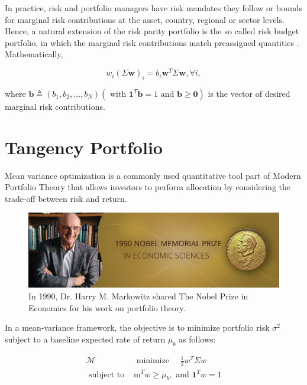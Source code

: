 \documentclass[]{book}
\theoremstyle{definition}
\theoremstyle{definition}
\theoremstyle{definition}
\theoremstyle{remark}
\begin{document}
In practice, risk and portfolio managers have risk mandates they follow
or bounds for marginal risk contributions at the asset, country,
regional or sector levels. Hence, a natural extension of the risk parity
portfolio is the so called risk budget portfolio, in which the marginal
risk contributions match preassigned quantities
\citep{R-riskParityPortfolio}. Mathematically,

\begin{equation}
w_{i}(\Sigma \mathbf{w})_{i}=b_{i} \mathbf{w}^{T} \Sigma \mathbf{w}, \forall i,
\end{equation}

where
\(\mathbf{b} \triangleq\left(b_{1}, b_{2}, \ldots, b_{N}\right)\left(\text { with } \mathbf{1}^{T} \mathbf{b}=1 \text { and } \mathbf{b} \geq \mathbf{0}\right)\)
is the vector of desired marginal risk contributions.

\section{Tangency Portfolio}\label{tangency-portfolio}

Mean variance optimization is a commonly used quantitative tool part of
Modern Portfolio Theory that allows investors to perform allocation by
considering the trade-off between risk and return.

\begin{figure}[H]

{\centering \includegraphics[width=1\linewidth]{./chapters/RiskParity/harry} 

}

\caption{In 1990, Dr. Harry M. Markowitz shared The Nobel Prize in Economics for his work on portfolio theory.}\label{fig:unnamed-chunk-40}
\end{figure}

In a mean-variance framework, the objective is to minimize portfolio
risk \(\sigma^2\) subject to a baseline expected rate of return
\(\mu_b\) as follows:

\begin{equation}
\begin{array}{ll}{\mathcal{M}} & {\text { minimize } \quad \frac{1}{2} w^{T} \Sigma w} \\ {\text { subject to }} & {\mathrm{m}^{T} w \geq \mu_{b}, \text { and } \mathbf{1}^{T} w=1}\end{array}
\end{equation}
\end{document}
